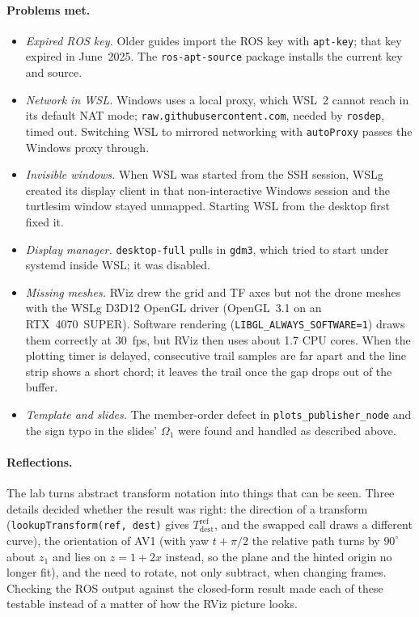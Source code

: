 \documentclass[a4paper]{tufte-handout}
\begin{document}
\paragraph{Problems met.}
\begin{itemize}
\item \emph{Expired ROS key.} Older guides import the ROS key with
\texttt{apt-key}; that key expired in June~2025. The \texttt{ros-apt-source}
package installs the current key and source.
\item \emph{Network in WSL.} Windows uses a local proxy, which WSL~2 cannot
reach in its default NAT mode; \texttt{raw.githubusercontent.com}, needed by
\texttt{rosdep}, timed out. Switching WSL to mirrored networking with
\texttt{autoProxy} passes the Windows proxy through.
\item \emph{Invisible windows.} When WSL was started from the SSH session,
WSLg created its display client in that non-interactive Windows session and
the turtlesim window stayed unmapped. Starting WSL from the desktop first
fixed it.
\item \emph{Display manager.} \texttt{desktop-full} pulls in \texttt{gdm3},
which tried to start under systemd inside WSL; it was disabled.
\item \emph{Missing meshes.} RViz drew the grid and TF axes but not the drone
meshes with the WSLg D3D12 OpenGL driver (OpenGL~3.1 on an RTX~4070~SUPER).
Software rendering (\texttt{LIBGL\_ALWAYS\_SOFTWARE=1}) draws them correctly
at \SI{30}{fps}, but RViz then uses about 1.7 CPU cores. When the plotting
timer is delayed, consecutive trail samples are far apart and the line strip
shows a short chord; it leaves the trail once the gap drops out of the
buffer.
\item \emph{Template and slides.} The member-order defect in
\texttt{plots\_publisher\_node} and the sign typo in the slides' $\Omega_1$
were found and handled as described above.
\end{itemize}

\paragraph{Reflections.}
The lab turns abstract transform notation into things that can be seen.
Three details decided whether the result was right: the direction of a
transform (\texttt{lookupTransform(ref, dest)} gives $T^{\mathrm{ref}}_{\mathrm{dest}}$,
and the swapped call draws a different curve), the orientation of AV1 (with
yaw $t + \pi/2$ the relative path turns by $90^\circ$ about $z_1$ and lies on
$z = 1 + 2x$ instead, so the plane and the hinted origin no longer fit), and the need to rotate, not only
subtract, when changing frames.
Checking the ROS output against the closed-form result made each of these
testable instead of a matter of how the RViz picture looks.
\end{document}
